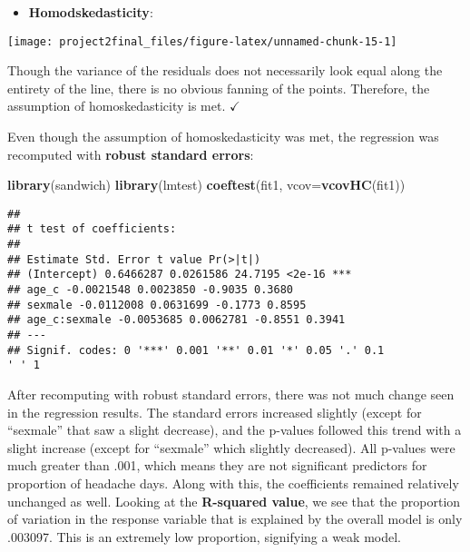 \documentclass[]{article}
\newenvironment{Shaded}{\begin{snugshade}}{\end{snugshade}}
\newcommand{\DataTypeTok}[1]{\textcolor[rgb]{0.13,0.29,0.53}{#1}}
\newcommand{\DecValTok}[1]{\textcolor[rgb]{0.00,0.00,0.81}{#1}}
\newcommand{\KeywordTok}[1]{\textcolor[rgb]{0.13,0.29,0.53}{\textbf{#1}}}
\newcommand{\NormalTok}[1]{#1}
\newcommand{\OperatorTok}[1]{\textcolor[rgb]{0.81,0.36,0.00}{\textbf{#1}}}
\newcommand{\StringTok}[1]{\textcolor[rgb]{0.31,0.60,0.02}{#1}}
\providecommand{\tightlist}{%
  \setlength{\itemsep}{0pt}\setlength{\parskip}{0pt}}
\begin{document}
\begin{itemize}
\tightlist
\item
  \textbf{Homodskedasticity}:
\end{itemize}

\begin{Shaded}
\end{Shaded}

\begin{center}\texttt{[image: project2final\_files/figure-latex/unnamed-chunk-15-1]} \end{center}

Though the variance of the residuals does not necessarily look equal
along the entirety of the line, there is no obvious fanning of the
points. Therefore, the assumption of homoskedasticity is met.
\(\checkmark\)

Even though the assumption of homoskedasticity was met, the regression
was recomputed with \textbf{robust standard errors}:

\begin{Shaded}
\begin{Highlighting}[]
\KeywordTok{library}\NormalTok{(sandwich)}
\KeywordTok{library}\NormalTok{(lmtest)}
\KeywordTok{coeftest}\NormalTok{(fit1, }\DataTypeTok{vcov=}\KeywordTok{vcovHC}\NormalTok{(fit1))}
\end{Highlighting}
\end{Shaded}

\begin{verbatim}
##
## t test of coefficients:
##
## Estimate Std. Error t value Pr(>|t|)
## (Intercept) 0.6466287 0.0261586 24.7195 <2e-16 ***
## age_c -0.0021548 0.0023850 -0.9035 0.3680
## sexmale -0.0112008 0.0631699 -0.1773 0.8595
## age_c:sexmale -0.0053685 0.0062781 -0.8551 0.3941
## ---
## Signif. codes: 0 '***' 0.001 '**' 0.01 '*' 0.05 '.' 0.1
' ' 1
\end{verbatim}

After recomputing with robust standard errors, there was not much change
seen in the regression results. The standard errors increased slightly
(except for ``sexmale'' that saw a slight decrease), and the p-values
followed this trend with a slight increase (except for ``sexmale'' which
slightly decreased). All p-values were much greater than .001, which
means they are not significant predictors for proportion of headache
days. Along with this, the coefficients remained relatively unchanged as
well. Looking at the \textbf{R-squared value}, we see that the
proportion of variation in the response variable that is explained by
the overall model is only .003097. This is an extremely low proportion,
signifying a weak model.
\end{document}
